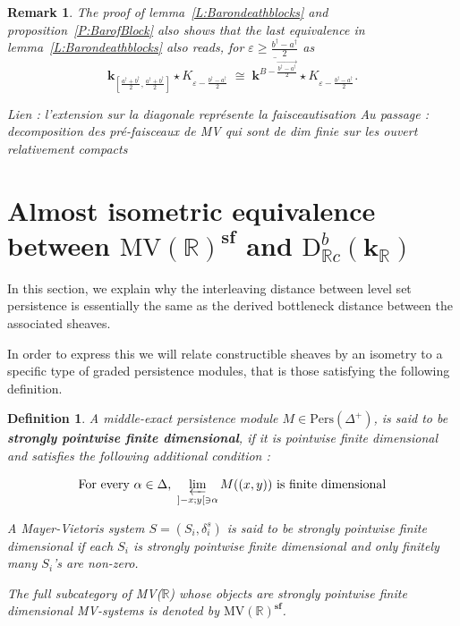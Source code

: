 \documentclass[a4paper, english, 11pt]{article}
\newcommand{\kk}[0]{\textbf{k}}
\newcommand{\0}{\vec{0}}
\newcommand{\R}[0]{\mathbb{R}}
\newcommand{\D}[0]{\text{D}}
\newcommand{\Pers}[0]{\text{Pers}}
\newcommand{\s}{\textbf{sf}}
\newtheorem{remark}[prop]{Remark}
\newtheorem{defi}[prop]{Definition}
\begin{document}
\begin{remark} The proof of lemma~\ref{L:Barondeathblocks} and proposition~\ref{P:BarofBlock} also shows that the last equivalence in lemma~\ref{L:Barondeathblocks} also reads, for $\varepsilon \geq \frac{b^\dagger-a^\dagger}{2}$ as
 \begin{equation}
  \kk_{[\frac{a^\dagger+b^\dagger}{2}, \frac{a^\dagger+b^\dagger}{2}]}\star K_{\varepsilon -\frac{b^\dagger -a^\dagger}{2}} \; \cong \; \overline{\kk^{B -\vec{\frac{b^\dagger-a^\dagger}{2}}}} \star  K_{\varepsilon -\frac{b^\dagger -a^\dagger}{2}}.
 \end{equation}

\end{remark}


\emph{
Lien : l'extension sur la diagonale représente la faisceautisation
Au passage : decomposition des pré-faisceaux de MV qui sont de dim finie sur les ouvert relativement compacts
}


\section{ Almost isometric equivalence between $\mbox{MV}(\R)^\s$ and $\D^b_{\R c}(\kk_\R)$}
In this section, we explain why the interleaving distance between level set persistence is essentially the same as the derived bottleneck distance between the associated sheaves.

In order to express this we will relate constructible sheaves by an isometry to a specific type of graded persistence modules, that is those satisfying the following definition.
\begin{defi}\label{D:spfd}
 A middle-exact persistence module $M\in \Pers(\Delta^+)$, is said to be \textbf{strongly pointwise finite dimensional}, if it is pointwise finite dimensional and satisfies the following additional condition : 

$$\text{For every $\alpha \in \Delta$,}~ \varprojlim_{]-x;y[\ni \alpha}M((x,y))  ~ \text{is finite dimensional} $$

A  Mayer-Vietoris system $S=(S_i,\delta^s_i)$ is said to be strongly pointwise finite dimensional if each $S_i$ is strongly pointwise finite dimensional  and only finitely many  $S_i$'s are non-zero.

The full subcategory of MV($\R$) whose objects are strongly pointwise finite dimensional MV-systems is denoted by $\text{MV}(\R)^\s$.
\end{defi}
\end{document}
